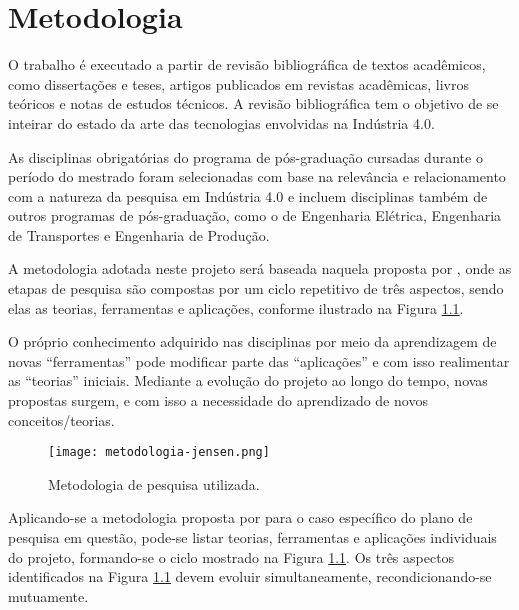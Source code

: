 \chapter{Metodologia}

	O trabalho é executado a partir de revisão bibliográfica de textos acadêmicos, como dissertações e teses, artigos publicados em revistas acadêmicas, livros teóricos e notas de estudos técnicos. A revisão bibliográfica tem o objetivo de se inteirar do estado da arte das tecnologias envolvidas na Indústria 4.0.
	
	As disciplinas obrigatórias do programa de pós-graduação cursadas durante o período do mestrado foram selecionadas com base na relevância e relacionamento com a natureza da pesquisa em Indústria 4.0 e incluem disciplinas também de outros programas de pós-graduação, como o de Engenharia Elétrica, Engenharia de Transportes e Engenharia de Produção.
	
	A metodologia adotada neste projeto será baseada naquela proposta por , onde as etapas de pesquisa são compostas por um ciclo repetitivo de três aspectos, sendo elas as teorias, ferramentas e aplicações, conforme ilustrado na Figura \ref{fig:metodologia-jensen}.
	
	O próprio conhecimento adquirido nas disciplinas por meio da aprendizagem de novas “ferramentas” pode modificar parte das “aplicações” e com isso realimentar as “teorias” iniciais. Mediante a evolução do projeto ao longo do tempo, novas propostas surgem, e com isso a necessidade do aprendizado de novos conceitos/teorias.

	\begin{figure}[H]
		\centering
		\caption{Metodologia de pesquisa utilizada.}
		\texttt{[image: metodologia-jensen.png]}
		\label{fig:metodologia-jensen}
	\end{figure}

	Aplicando-se a metodologia proposta por  para o caso específico do plano de pesquisa em questão, pode-se listar teorias, ferramentas e aplicações individuais do projeto, formando-se o ciclo mostrado na Figura \ref{fig:metodologia-jensen}. Os três aspectos identificados na Figura \ref{fig:metodologia-jensen} devem evoluir simultaneamente, recondicionando-se mutuamente.

